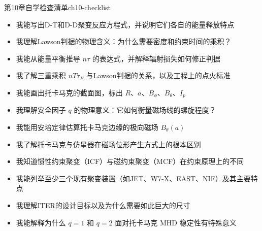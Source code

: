 \begin{checklistbox}{第10章自学检查清单}{ch10-checklist}
\begin{itemize}[leftmargin=*,label=$\square$]
\item[$\square$] 我能写出D-T和D-D聚变反应方程式，并说明它们各自的能量释放特点
\item[$\square$] 我理解Lawson判据的物理含义：为什么需要密度和约束时间的乘积？
\item[$\square$] 我能从能量平衡推导 $n\tau$ 的表达式，并解释辐射损失如何修正判据
\item[$\square$] 我了解三重乘积 $nT\tau_E$ 与Lawson判据的关系，以及工程上的点火标准
\item[$\square$] 我能画出托卡马克的截面图，标出 $R$、$a$、$B_{\phi}$、$B_{\theta}$、$I_p$
\item[$\square$] 我理解安全因子 $q$ 的物理意义：它如何衡量磁场线的螺旋程度？
\item[$\square$] 我能用安培定律估算托卡马克边缘的极向磁场 $B_{\theta}(a)$
\item[$\square$] 我了解托卡马克与仿星器在磁场位形产生方式上的根本区别
\item[$\square$] 我知道惯性约束聚变（ICF）与磁约束聚变（MCF）在约束原理上的不同
\item[$\square$] 我能列举至少三个现有聚变装置（如JET、W7-X、EAST、NIF）及其主要特点
\item[$\square$] 我理解ITER的设计目标以及为什么需要如此巨大的尺寸
\item[$\square$] 我能解释为什么 $q=1$ 和 $q=2$ 面对托卡马克 MHD 稳定性有特殊意义
\end{itemize}
\end{checklistbox}

\endinput
